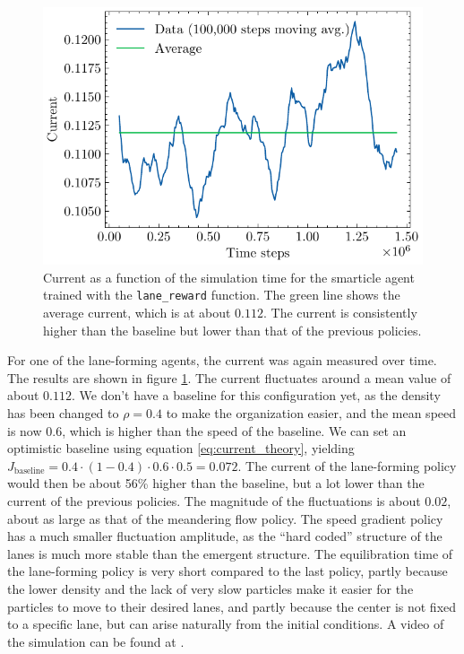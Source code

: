 \begin{figure}[h]
    \centering
    \includegraphics{lanes_current.pdf}
    \caption{Current as a function of the simulation time for the smarticle agent trained with the \texttt{lane\_reward} function. The green line shows the average current, which is at about $0.112$. The current is consistently higher than the baseline but lower than that of the previous policies.}
    \label{fig:lanes_current}
\end{figure}

For one of the lane-forming agents, the current was again measured over time. The results are shown in figure \ref{fig:lanes_current}. The current fluctuates around a mean value of about $0.112$. We don't have a baseline for this configuration yet, as the density has been changed to $\rho=0.4$ to make the organization easier, and the mean speed is now $0.6$, which is higher than the speed of the baseline. We can set an optimistic baseline using equation \ref{eq:current_theory}, yielding $J_{\text{baseline}}=0.4\cdot(1-0.4)\cdot0.6\cdot0.5=0.072$. The current of the lane-forming policy would then be about 56\% higher than the baseline, but a lot lower than the current of the previous policies. The magnitude of the fluctuations is about $0.02$, about as large as that of the meandering flow policy. The speed gradient policy has a much smaller fluctuation amplitude, as the \enquote{hard coded} structure of the lanes is much more stable than the emergent structure. The equilibration time of the lane-forming policy is very short compared to the last policy, partly because the lower density and the lack of very slow particles make it easier for the particles to move to their desired lanes, and partly because the center is not fixed to a specific lane, but can arise naturally from the initial conditions. A video of the simulation can be found at \cite{maertens_smarticle_lane_vid_local}.


